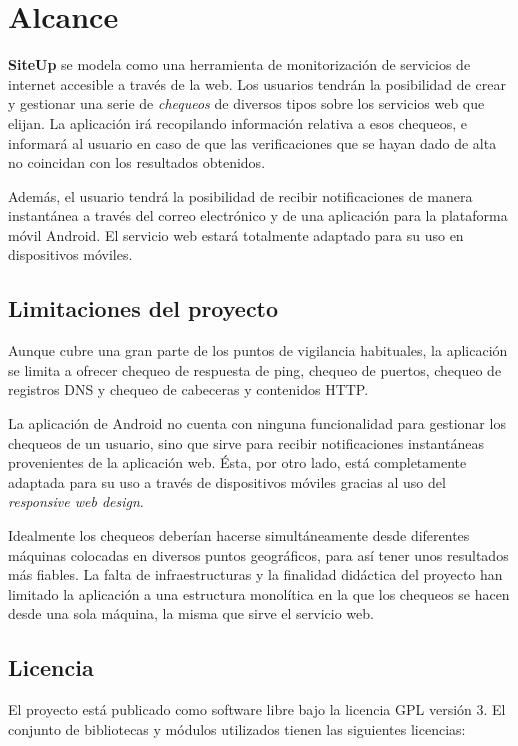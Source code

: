 \section{Alcance}
\textbf{SiteUp} se modela como una herramienta de monitorización de servicios de
internet accesible a través de la web. Los usuarios tendrán la posibilidad de
crear y gestionar una serie de \textit{chequeos} de diversos tipos sobre los
servicios web que elijan. La aplicación irá recopilando información relativa a
esos chequeos, e informará al usuario en caso de que las verificaciones que se
hayan dado de alta no coincidan con los resultados obtenidos.

Además, el usuario tendrá la posibilidad de recibir notificaciones de manera
instantánea a través del correo electrónico y de una aplicación para la
plataforma móvil Android. El servicio web estará totalmente adaptado para su uso
en dispositivos móviles.

\subsection{Limitaciones del proyecto}
Aunque cubre una gran parte de los puntos de vigilancia habituales, la
aplicación se limita a ofrecer chequeo de respuesta de ping, chequeo de puertos,
chequeo de registros DNS y chequeo de cabeceras y contenidos HTTP.

La aplicación de Android no cuenta con ninguna funcionalidad para gestionar los
chequeos de un usuario, sino que sirve para recibir notificaciones instantáneas
provenientes de la aplicación web. Ésta, por otro lado, está completamente
adaptada para su uso a través de dispositivos móviles gracias al uso del
\textit{responsive web design}.

Idealmente los chequeos deberían hacerse simultáneamente desde diferentes
máquinas colocadas en diversos puntos geográficos, para así tener unos
resultados más fiables. La falta de infraestructuras y la finalidad didáctica
del proyecto han limitado la aplicación a una estructura monolítica en la que
los chequeos se hacen desde una sola máquina, la misma que sirve el servicio
web.

\subsection{Licencia}
El proyecto está publicado como software libre bajo la licencia
\ac{GPL} versión 3. El conjunto de bibliotecas y módulos utilizados
tienen las siguientes licencias:

